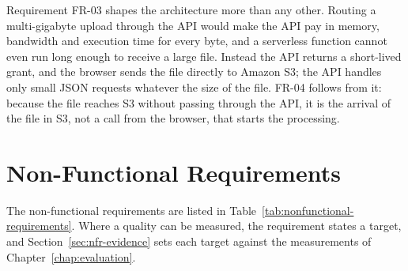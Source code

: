Requirement FR-03 shapes the architecture more than any other. Routing a multi-gigabyte upload
through the API would make the API pay in memory, bandwidth and execution time for every byte, and
a serverless function cannot even run long enough to receive a large file. Instead the API returns
a short-lived grant, and the browser sends the file directly to Amazon S3; the API handles only small
JSON requests whatever the size of the file. FR-04 follows from it: because the file reaches S3
without passing through the API, it is the arrival of the file in S3, not a call from the browser,
that starts the processing.

\section{Non-Functional Requirements}
\label{sec:nonfunctional-requirements}

The non-functional requirements are listed in Table~\ref{tab:nonfunctional-requirements}. Where a
quality can be measured, the requirement states a target, and Section~\ref{sec:nfr-evidence} sets
each target against the measurements of Chapter~\ref{chap:evaluation}.

